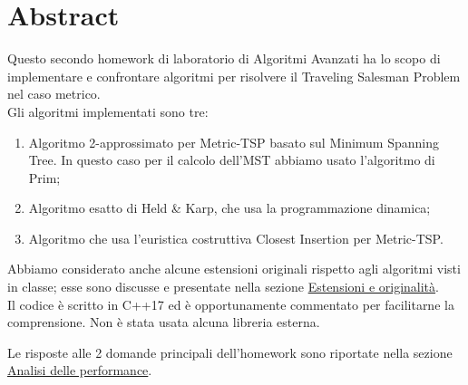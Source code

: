 \section{Abstract}
\label{cap:abstract}

Questo secondo homework di laboratorio di Algoritmi Avanzati ha lo scopo di implementare e confrontare algoritmi per risolvere il Traveling Salesman Problem nel caso metrico. \\

\noindent Gli algoritmi implementati sono tre:

\begin{enumerate}
    \item Algoritmo 2-approssimato per Metric-TSP basato sul Minimum Spanning Tree. In questo caso per il calcolo dell'MST abbiamo usato l'algoritmo di Prim;
    \item Algoritmo esatto di Held \& Karp, che usa la programmazione dinamica;
    \item Algoritmo che usa l'euristica costruttiva Closest Insertion per Metric-TSP.
\end{enumerate}

\noindent Abbiamo considerato anche alcune estensioni originali rispetto agli algoritmi visti in classe; esse sono discusse e presentate nella sezione \hyperref[cap:extensions-and-originalities]{Estensioni e originalità}. \\

\noindent Il codice è scritto in C++17 ed è opportunamente commentato per facilitarne la comprensione. Non è stata usata alcuna libreria esterna.

\noindent Le risposte alle 2 domande principali dell'homework sono riportate nella sezione \hyperref[cap:performance-analysis]{Analisi delle performance}.
